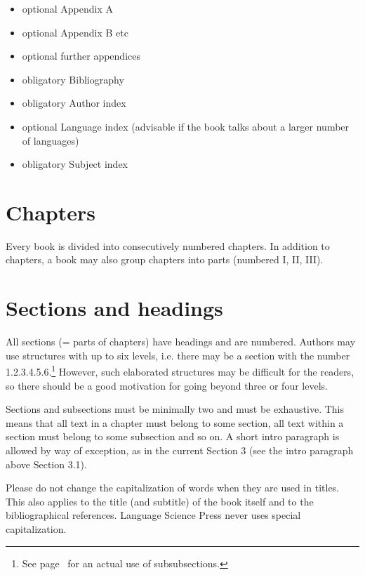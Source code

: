 \begin{itemize}
 \item optional Appendix A
 \item optional Appendix B etc
 \item optional further appendices
 \item obligatory Bibliography
 \item obligatory Author index
 \item optional Language index (advisable if the book talks about a larger number of languages)
 \item obligatory Subject index
 
\end{itemize}


\section{Chapters}

Every book is divided into consecutively numbered chapters. In addition to chapters, a book may also
group chapters into parts (numbered I, II, III). %




\section{Sections and headings}

All sections (= parts of chapters) have headings and are numbered. Authors may use structures with up to
six levels, i.e. there may be a section with the number 1.2.3.4.5.6.\footnote{
  See page~\pageref{sec-Chinese} for an actual use of subsubsections.%
} However, such elaborated
structures may be difficult for the readers, so there should be a good motivation for going beyond
three or four levels.

Sections and subsections must be minimally two and must be exhaustive. This means that all text in a chapter
must belong to some section, all text within a section must belong to some subsection and so on. A
short intro paragraph is allowed by way of exception, as in the current Section 3 (see the intro
paragraph above Section 3.1).

Please do not change the capitalization of words when they are used in titles. 
This also applies
to the title (and subtitle) of the book itself and to the bibliographical references. Language
Science Press never uses special capitalization.

